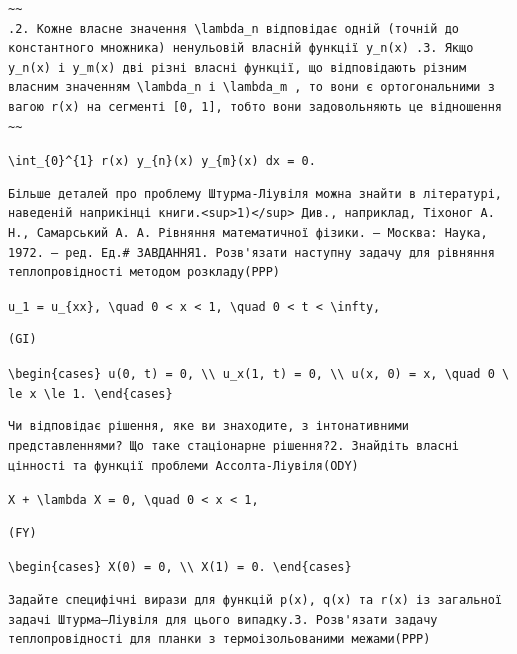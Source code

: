 \documentclass[
  ukrainian,
]{article}
\begin{document}
\begin{verbatim}
~~
.2. Кожне власне значення \lambda_n відповідає одній (точній до константного множника) ненульовій власній функції y_n(x) .3. Якщо y_n(x) і y_m(x) дві різні власні функції, що відповідають різним власним значенням \lambda_n і \lambda_m , то вони є ортогональними з вагою r(x) на сегменті [0, 1], тобто вони задовольняють це відношення
~~
\end{verbatim}

\texttt{\textbackslash{}int\_\{0\}\^{}\{1\}\ r(x)\ y\_\{n\}(x)\ y\_\{m\}(x)\ dx\ =\ 0.}

\begin{verbatim}
Більше деталей про проблему Штурма-Ліувіля можна знайти в літературі, наведеній наприкінці книги.<sup>1)</sup> Див., наприклад, Тіхоног А. Н., Самарський А. А. Рівняння математичної фізики. — Москва: Наука, 1972. — ред. Ед.# ЗАВДАННЯ1. Розв'язати наступну задачу для рівняння теплопровідності методом розкладу(PPP)
\end{verbatim}

\texttt{u\_1\ =\ u\_\{xx\},\ \textbackslash{}quad\ 0\ \textless{}\ x\ \textless{}\ 1,\ \textbackslash{}quad\ 0\ \textless{}\ t\ \textless{}\ \textbackslash{}infty,}

\begin{verbatim}
(GI)
\end{verbatim}

\texttt{\textbackslash{}begin\{cases\}\ u(0,\ t)\ =\ 0,\ \textbackslash{}\textbackslash{}\ u\_x(1,\ t)\ =\ 0,\ \textbackslash{}\textbackslash{}\ u(x,\ 0)\ =\ x,\ \textbackslash{}quad\ 0\ \textbackslash{}le\ x\ \textbackslash{}le\ 1.\ \textbackslash{}end\{cases\}}

\begin{verbatim}
Чи відповідає рішення, яке ви знаходите, з інтонативними представленнями? Що таке стаціонарне рішення?2. Знайдіть власні цінності та функції проблеми Ассолта-Ліувіля(ODY)
\end{verbatim}

\texttt{X\textquotesingle{}\ +\ \textbackslash{}lambda\ X\ =\ 0,\ \textbackslash{}quad\ 0\ \textless{}\ x\ \textless{}\ 1,}

\begin{verbatim}
(FY)
\end{verbatim}

\texttt{\textbackslash{}begin\{cases\}\ X(0)\ =\ 0,\ \textbackslash{}\textbackslash{}\ X\textquotesingle{}(1)\ =\ 0.\ \textbackslash{}end\{cases\}}

\begin{verbatim}
Задайте специфічні вирази для функцій p(x), q(x) та r(x) із загальної задачі Штурма–Ліувіля для цього випадку.3. Розв'язати задачу теплопровідності для планки з термоізольованими межами(PPP)
\end{verbatim}
\end{document}
